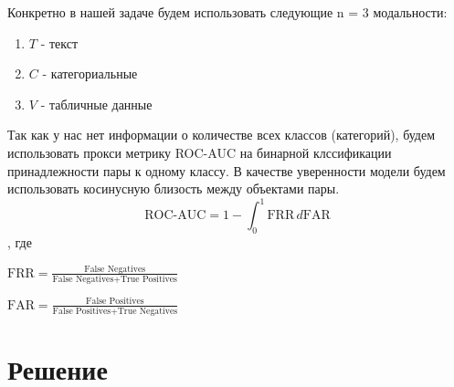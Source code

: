 \documentclass{article}
\begin{document}
Конкретно в нашей задаче будем использовать следующие n = 3 модальности:
\begin{enumerate}
    \item $T$ - текст
    \item $C$ - категориальные
    \item $V$ - табличные данные
\end{enumerate}
Так как у нас нет информации о количестве всех классов (категорий), будем использовать прокси метрику ROC-AUC на бинарной клссификации принадлежности пары к одному классу. В качестве уверенности модели будем использовать косинусную близость между объектами пары. 
$$\text{ROC-AUC} = 1 - \int_{0}^{1} \text{FRR} \, d\text{FAR}$$, где 

$\text{FRR} = \frac{\text{False Negatives}}{\text{False Negatives} + \text{True Positives}}$


$\text{FAR} = \frac{\text{False Positives}}{\text{False Positives} + \text{True Negatives}}$

\section{Решение}
\end{document}
